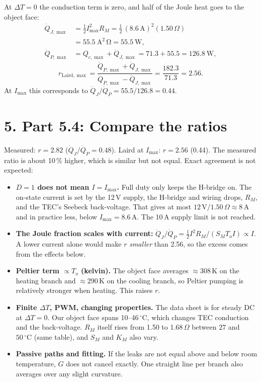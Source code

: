 \documentclass[reprint, amsmath, amssymb, aps]{revtex4-2}
\newcommand{\Qdot}{\dot Q}
\newcommand{\degC}{\,^\circ\mathrm{C}}
\begin{document}
At $\Delta T = 0$ the conduction term is zero, and half of the Joule heat goes to the object
face:
\begin{align}
\Qdot_{J,\max} &= \tfrac12 I_{\max}^2 R_M = \tfrac12\,(8.6\,\mathrm{A})^2(1.50\,\Omega)\nonumber\\ &= 55.5\ \mathrm{A^2\,\Omega} = 55.5\ \mathrm{W},\\
\Qdot_{P,\max} &= Q_{c,\max} + \Qdot_{J,\max} = 71.3 + 55.5 = 126.8\ \mathrm{W},
\end{align}
\begin{equation}
r_{\mathrm{Laird},\max} = \frac{\Qdot_{P,\max} + \Qdot_{J,\max}}{\Qdot_{P,\max} - \Qdot_{J,\max}}
= \frac{182.3}{71.3} = 2.56 .
\end{equation}
At $I_{\max}$ this corresponds to $\Qdot_J/\Qdot_P = 55.5/126.8 = 0.44$.

\section*{5. Part 5.4: Compare the ratios}

Measured: $r = 2.82$ ($\Qdot_J/\Qdot_P = 0.48$). Laird at $I_{\max}$: $r = 2.56$ (0.44). The
measured ratio is about 10\,\% higher, which is similar but not equal. Exact agreement is not
expected:
\begin{itemize}
\item \textbf{$D = 1$ does not mean $I = I_{\max}$.} Full duty only keeps the H-bridge on. The
on-state current is set by the 12\,V supply, the H-bridge and wiring drops, $R_M$, and the
TEC's Seebeck back-voltage. That gives at most $12\,\mathrm{V}/1.50\,\Omega \approx 8$\,A and
in practice less, below $I_{\max} = 8.6$\,A. The 10\,A supply limit is not reached.
\item \textbf{The Joule fraction scales with current:}
$\Qdot_J/\Qdot_P = \tfrac12 I^2R_M/(S_M T_o I) \propto I$. A lower current alone would make $r$
\emph{smaller} than 2.56, so the excess comes from the effects below.
\item \textbf{Peltier term $\propto T_o$ (kelvin).} The object face averages $\approx 308$\,K
on the heating branch and $\approx 290$\,K on the cooling branch, so Peltier pumping is
relatively stronger when heating. This raises $r$.
\item \textbf{Finite $\Delta T$, PWM, changing properties.} The data sheet is for steady DC at
$\Delta T = 0$. Our object face spans 10--46\,$^\circ$C, which changes TEC conduction and the
back-voltage. $R_M$ itself rises from 1.50 to 1.68\,$\Omega$ between 27 and $50\degC$ (same
table), and $S_M$ and $K_M$ also vary.
\item \textbf{Passive paths and fitting.} If the leaks are not equal above and below room
temperature, $G$ does not cancel exactly. One straight line per branch also averages over any
slight curvature.
\end{itemize}
\end{document}
